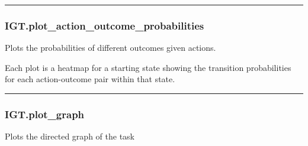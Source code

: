 \begin{center}\rule{0.5\linewidth}{\linethickness}\end{center}

\subsubsection{IGT.plot\_action\_outcome\_probabilities}\label{igt.plot_action_outcome_probabilities}

\begin{Shaded}
\begin{Highlighting}[]
\OperatorTok{=}\OperatorTok{=}\OperatorTok{=}\OperatorTok{=}\NormalTok{)}
\end{Highlighting}
\end{Shaded}

Plots the probabilities of different outcomes given actions.

Each plot is a heatmap for a starting state showing the transition
probabilities for each action-outcome pair within that state.

\begin{center}\rule{0.5\linewidth}{\linethickness}\end{center}

\subsubsection{IGT.plot\_graph}\label{igt.plot_graph}

\begin{Shaded}
\begin{Highlighting}[]
\OperatorTok{=}\OperatorTok{=}\OperatorTok{=}\OperatorTok{=}\OperatorTok{=}\OperatorTok{=}\OperatorTok{=}\OperatorTok{=}\NormalTok{)}
\end{Highlighting}
\end{Shaded}

Plots the directed graph of the task

